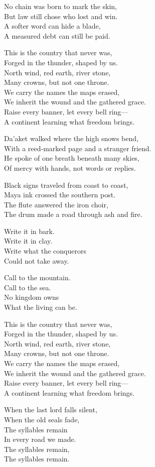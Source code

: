 \begin{lyrics}
No chain was born to mark the skin,\\
But law still chose who lost and win.\\
A softer word can hide a blade,\\
A measured debt can still be paid.

This is the country that never was,\\
Forged in the thunder, shaped by us.\\
North wind, red earth, river stone,\\
Many crowns, but not one throne.\\
We carry the names the maps erased,\\
We inherit the wound and the gathered grace.\\
Raise every banner, let every bell ring—\\
A continent learning what freedom brings.

Da’aket walked where the high snows bend,\\
With a reed-marked page and a stranger friend.\\
He spoke of one breath beneath many skies,\\
Of mercy with hands, not words or replies.

Black signs traveled from coast to coast,\\
Maya ink crossed the southern post.\\
The flute answered the iron choir,\\
The drum made a road through ash and fire.

Write it in bark.\\
Write it in clay.\\
Write what the conquerors\\
Could not take away.

Call to the mountain.\\
Call to the sea.\\
No kingdom owns\\
What the living can be.

This is the country that never was,\\
Forged in the thunder, shaped by us.\\
North wind, red earth, river stone,\\
Many crowns, but not one throne.\\
We carry the names the maps erased,\\
We inherit the wound and the gathered grace.\\
Raise every banner, let every bell ring—\\
A continent learning what freedom brings.

When the last lord falls silent,\\
When the old seals fade,\\
The syllables remain\\
In every road we made.\\
The syllables remain,\\
The syllables remain.
\end{lyrics}


